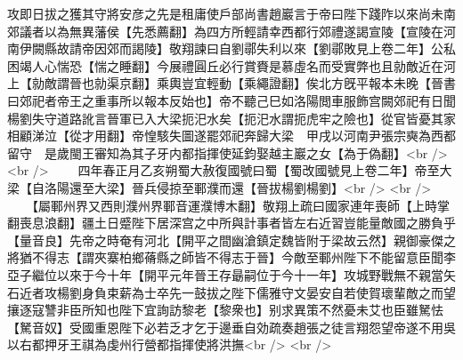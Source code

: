攻即日拔之獲其守將安彦之先是租庸使戶部尚書趙巖言于帝曰陛下踐阼以來尚未南郊議者以為無異藩侯【先悉薦翻】為四方所輕請幸西都行郊禮遂謁宣陵【宣陵在河南伊闕縣故請帝因郊而謁陵】敬翔諫曰自劉鄩失利以來【劉鄩敗見上卷二年】公私困竭人心惴恐【惴之睡翻】今展禮圓丘必行賞賚是慕虛名而受實弊也且勍敵近在河上【勍敵謂晉也勍渠京翻】乘輿豈宜輕動【乘繩證翻】俟北方旣平報本未晚【晉書曰郊祀者帝王之重事所以報本反始也】帝不聽己巳如洛陽閲車服飾宫闕郊祀有日聞楊劉失守道路訛言晉軍已入大梁扼汜水矣【扼汜水謂扼虎牢之險也】從官皆憂其家相顧涕泣【從才用翻】帝惶駭失圖遂罷郊祀奔歸大梁　甲戌以河南尹張宗奭為西都留守　是歲閩王審知為其子牙内都指揮使延鈞娶越主巖之女【為于偽翻】<br />
<br />
　　四年春正月乙亥朔蜀大赦復國號曰蜀【蜀改國號見上卷二年】帝至大梁【自洛陽還至大梁】晉兵侵掠至鄆濮而還【晉拔楊劉楊劉】<br />
<br />
　　【屬鄆州界又西則濮州界鄆音運濮博木翻】敬翔上疏曰國家連年喪師【上時掌翻喪息浪翻】疆土日蹙陛下居深宫之中所與計事者皆左右近習豈能量敵國之勝負乎【量音良】先帝之時奄有河北【開平之間幽滄鎮定魏皆附于梁故云然】親御豪傑之將猶不得志【謂夾寨柏鄉蓨縣之師皆不得志于晉】今敵至鄆州陛下不能留意臣聞李亞子繼位以來于今十年【開平元年晉王存朂嗣位于今十一年】攻城野戰無不親當矢石近者攻楊劉身負束薪為士卒先一鼓拔之陛下儒雅守文晏安自若使賀瓌輩敵之而望攘逐寇讐非臣所知也陛下宜詢訪黎老【黎衆也】别求異策不然憂未艾也臣雖駑怯【駑音奴】受國重恩陛下必若乏才乞于邊垂自効疏奏趙張之徒言翔怨望帝遂不用吳以右都押牙王祺為虔州行營都指揮使將洪撫<br />
<br />
